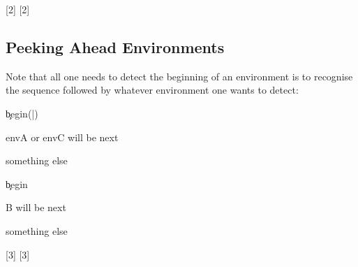\documentclass[10pt]{article}
\begin{document}
[2]
[2]


\begin{codestore}[demoA]

  
  
\end{codestore}


\subsection{Peeking Ahead Environments}

Note that all one needs to detect the beginning of an environment is to recognise the sequence  followed by whatever environment one wants to detect:

\begin{codestore}[cmd-defs]
\xpeekSetCmd{\detectEnvAC}
  {\c{begin}(|)}
  {\hspace{5mm} envA or envC will be next\par}
  {\hspace{5mm} something else\par}

\xpeekSetCmd{\detectEnvB}
  {\c{begin}}
  {\hspace{5mm} B will be next\par}
  {\hspace{5mm} something else\par}
\end{codestore}
[3]
[3]
\end{document}
